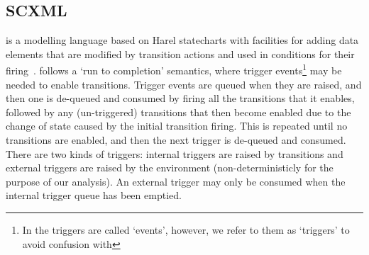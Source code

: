 
\subsection{SCXML}
\label{sec:scxml}

\SCXML is a modelling language based on Harel statecharts with facilities for adding data elements that are modified by transition actions and used in conditions for their firing~\cite{scxmlwebsite}. \SCXML follows a `run to completion' semantics, where trigger events\footnote{In \SCXML the triggers are called `events', however, we refer to them as `triggers' to avoid confusion with \EventB} may be needed to enable transitions. Trigger events are queued when they are raised, and then one is de-queued and consumed by firing all the transitions that it enables, followed by any (un-triggered) transitions that then become enabled due to the change of state caused by the initial transition firing. This is repeated until no transitions are enabled, and then the next trigger is de-queued and consumed. There are two kinds of triggers: internal triggers are raised by transitions and external triggers are raised by the environment (non-deterministicly for the purpose of our analysis). An external trigger may only be consumed when the internal trigger queue has been emptied. 



